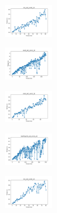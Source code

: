 \begin{figure}[H]
    \centering
    \begin{subfigure}
        \centering
        \includegraphics[width=0.234\textwidth]{img/bl/iris_set_const_10_949004259_time.png}
    \end{subfigure}
    \hfill
    \begin{subfigure}
        \centering
        \includegraphics[width=0.234\textwidth]{img/bl/ecoli_set_const_10_949004259_time.png}
    \end{subfigure}
    \hfill
    \begin{subfigure}
        \centering
        \includegraphics[width=0.234\textwidth]{img/bl/rand_set_const_10_949004259_time.png}
    \end{subfigure}
    \hfill
    \begin{subfigure}
        \centering
        \includegraphics[width=0.234\textwidth]{img/bl/newthyroid_set_const_10_949004259_time.png}
    \end{subfigure}
    \hfill
    \begin{subfigure}
        \centering
        \includegraphics[width=0.234\textwidth]{img/bl/iris_set_const_10_589741062_time.png}
    \end{subfigure}
    \hfill
    \begin{subfigure}

\end{subfigure}
\end{figure}
